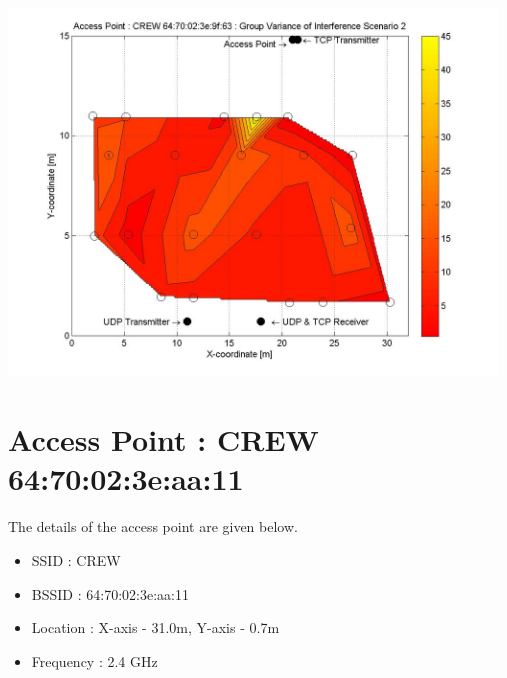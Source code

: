 \documentclass[11pt,a4paper,headinclude,footinclude,chapterprefix=on]{scrreprt}
\begin{document}
\begin{longtable}
	\includegraphics[width=13cm]{../../Source/plot/CREW_63/63_Wifi_Group_Variance.jpg} \\
\end{longtable}

\section{Access Point : CREW 64:70:02:3e:aa:11} 
The details of the access point are given below.
\begin{itemize}
	\item SSID : CREW 
	\item BSSID : 64:70:02:3e:aa:11 
	\item Location : X-axis - 31.0m, Y-axis - 0.7m 
	\item Frequency : 2.4 GHz 
\end{itemize}
\end{document}
